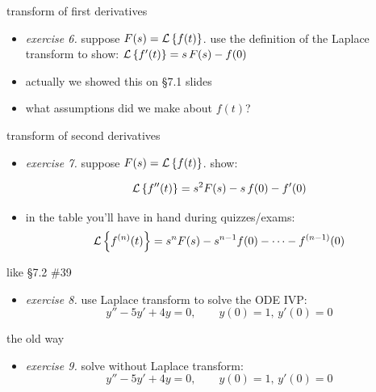 \documentclass[dvipsnames,colorlinks]{beamer}
\begin{document}
\begin{frame}{transform of first derivatives}

\begin{itemize}
\item \emph{exercise 6.}  suppose $F(s) = \mathcal{L}\left\{f(t)\right\}$.  use the definition of the Laplace transform to show: \qquad $\mathcal{L}\left\{f'(t)\right\} = s\, F(s) - f(0)$

\vspace{40mm}
\footnotesize
\item actually we showed this on \S7.1 slides
\item what assumptions did we make about $f(t)$?
\end{itemize}
\end{frame}


\begin{frame}{transform of second derivatives}

\begin{itemize}
\item \emph{exercise 7.}  suppose $F(s) = \mathcal{L}\left\{f(t)\right\}$.  show:

$$\mathcal{L}\left\{f''(t)\right\} = s^2 F(s) - s\, f(0) - f'(0)$$

\vspace{40mm}
\footnotesize
\item in the table you'll have in hand during quizzes/exams:
   $$\mathcal{L}\left\{f^{(n)}(t)\right\} = s^n F(s) - s^{n-1} f(0) - \dots - f^{(n-1)}(0)$$
\end{itemize}
\end{frame}


\begin{frame}{like \S7.2 \#39}

\begin{itemize}
\item \emph{exercise 8.}  use Laplace transform to solve the ODE IVP:
    $$y''-5y'+4y=0, \qquad y(0)=1, \, y'(0)=0$$

\vspace{55mm}
\end{itemize}
\end{frame}


\begin{frame}{the old way}

\begin{itemize}
\item \emph{exercise 9.}  solve without Laplace transform:
    $$y''-5y'+4y=0, \qquad y(0)=1, \, y'(0)=0$$

\vspace{55mm}
\end{itemize}
\end{frame}
\end{document}
